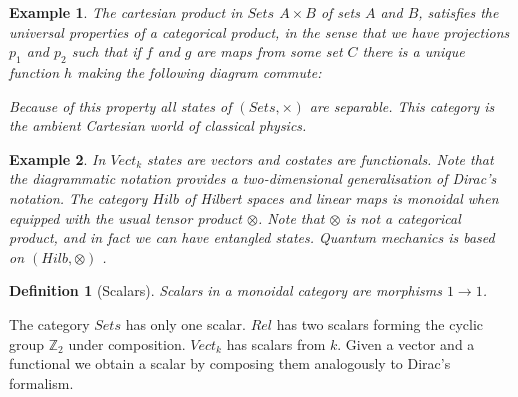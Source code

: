 \documentclass{article}
\newtheorem{definition}{Definition}
\newtheorem{example}{Example}
\begin{document}
\begin{example}
	The cartesian product in $Sets$ $A \times B$ of sets $A$ and $B$, satisfies the universal properties of a categorical product, in the sense that we have projections $p_1$ and $p_2$ such that if $f$ and $g$ are maps from some set $C$ there is a unique function $h$ making the following diagram commute:
	\begin{center}
	\end{center}
	Because of this property all states of $(Sets,\times)$ are separable. This category is the ambient Cartesian world of classical physics.
\end{example}
\begin{example}
	In $Vect_k$ states are vectors and costates are functionals. Note that the diagrammatic notation provides a two-dimensional generalisation of Dirac's notation. The category $Hilb$ of Hilbert spaces and linear maps is monoidal when equipped with the usual tensor product $\otimes$. Note that $\otimes$ is not a categorical product, and in fact we can have entangled states. Quantum mechanics is based on $(Hilb, \otimes)$ \cite{Vicary12}.
\end{example}
\begin{definition}[Scalars]
	Scalars in a monoidal category are morphisms $1 \rightarrow 1$.
\end{definition}
The category $Sets$ has only one scalar. $Rel$ has two scalars forming the cyclic group $\mathbb{Z}_2$ under composition. $Vect_k$ has scalars from $k$. Given a vector and a functional we obtain a scalar by composing them analogously to Dirac's formalism.
\end{document}
